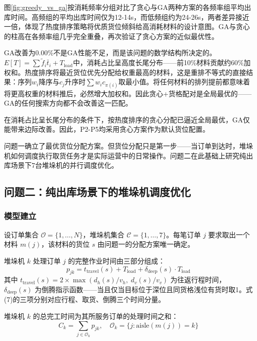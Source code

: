 \documentclass[a4paper]{cumcmthesis}
\newcommand{\cO}{\mathcal{O}}
\newcommand{\cC}{\mathcal{C}}
\newcommand{\ftilde}{\tilde{f}}
\begin{document}
图\ref{fig:greedy_vs_ga}按消耗频率分组对比了贪心与GA两种方案的各频率组平均出库时间。高频组的平均出库时间仅为12-14s，而低频组约为24-26s，两者差异接近一倍，体现了热度排序策略将优质货位倾斜给高消耗材料的设计意图。GA与贪心的柱高在各频率组几乎完全重叠，再次验证了贪心方案的近似最优性。

GA改善为0.00\%不是GA性能不足，而是该问题的数学结构所决定的。$E[T]=\sum\ftilde_i\bar{t}_i+T_{\text{load}}$中，消耗占比呈高度长尾分布——前10\%材料贡献约60\%加权和。热度排序将最近货位优先分配给权重最高的材料，这是重排不等式的直接结果：序列$w_i$降序与$c_j$升序时$\sum w_i c_{\pi(i)}$取最小值。将任何材料的排列提前都意味着将更高权重的材料推后，必然增大加权和。因此贪心+货格配对是全局最优的——GA的任何搜索方向都不会改善这一匹配。

在消耗占比呈长尾分布的条件下，按热度排序的贪心分配已逼近全局最优，GA仅能带来边际改善。因此，P2-P5均采用贪心方案作为默认货位配置。

\medskip
问题一确立了最优货位分配方案。但货位分配只是第一步——当订单到达时，堆垛机如何调度执行取货任务才是实际运营中的日常操作。问题二在此基础上研究纯出库场景下7台堆垛机的并行调度优化。

\subsection{问题二：纯出库场景下的堆垛机调度优化}

\FloatBarrier\subsubsection{模型建立}

设订单集合 $\cO=\{1,\dots,N\}$，堆垛机集合 $\cC=\{1,\dots,7\}$。每笔订单 $j$ 要求取出一个材料 $m(j)$，该材料的货位 $s$ 由问题一的分配方案唯一确定。

堆垛机 $k$ 处理订单 $j$ 的完整作业时间由三部分组成：
\begin{equation}
p_{jk}=t_{\text{travel}}(s)+T_{\text{load}}+\delta_{\text{deep}}(s)\cdot T_{\text{load}}
\end{equation}
其中 $t_{\text{travel}}(s)=2\times\max(d_h(s)/v_h,\; d_v(s)/v_v)$ 为往返行程时间，$\delta_{\text{deep}}(s)$ 为倒腾指示函数——当且仅当目标位于深位且同货格浅位有货时取1。式(7)的三项分别对应行程、取货、倒腾三个时间分量。

堆垛机 $k$ 的总完工时间为其所服务订单的处理时间之和：
\begin{equation}
C_k=\sum_{j\in\cO_k}p_{jk},\quad \cO_k=\{j:\text{aisle}(m(j))=k\}
\end{equation}
\end{document}
